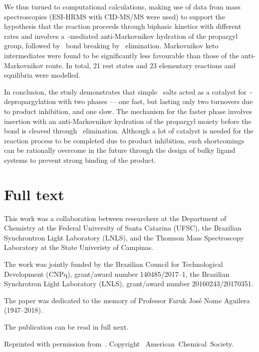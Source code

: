We thus turned to computational calculations,
making use of data from mass spectroscopies (ESI-HRMS with CID-MS/MS were used) to support the hypothesis
that the reaction proceeds through biphasic kinetics with different rates
and
involves a~-mediated anti-Markovnikov hydration of the propargyl group,
followed by~ bond breaking by~ elimination.
Markovnikov keto intermediates were found to be significantly less favourable than those of the anti-Markovnikov route.
In total,
21 rest states and 23 elementary reactions and equilibria were modelled.

In conclusion,
the study demonstrates that
simple~ salts acted as a catalyst for~-depropargylation with two phases --- one fast,
but lasting only two turnovers due to product inhibition,
and one slow.
The mechanism for the faster phase involves~ insertion
with an anti-Markovnikov hydration of the propargyl moiety before the~ bond is cleaved
through~ elimination.
Although a lot of catalyst is needed for the reaction process to be completed due to product inhibition,
such shortcomings can be rationally overcome in the future
through the design of bulky ligand systems
to prevent strong binding of the product.

\section{Full text}

This work was a collaboration between researchers
at the Department of Chemistry at the Federal University of Santa Catarina (UFSC),
the Brazilian Synchrontron Light Laboratory (LNLS),
and the Thomson Mass Spectroscopy Laboratory at the State Univeristy of Campinas.

The work was jointly funded by the Brazilian Council for Technological Development (CNPq),
grant/award number 140485/2017--1,
the Brazilian Synchrotron Light Laboratory (LNLS),
grant/award number 20160243/20170351.

The paper was dedicated to the memory of Professor Faruk José Nome Aguilera (1947--2018).

The publication can be read in full next.

Reprinted with permission from~.
Copyright~\citeyear{Coelho_2019}
American~Chemical~Society.


